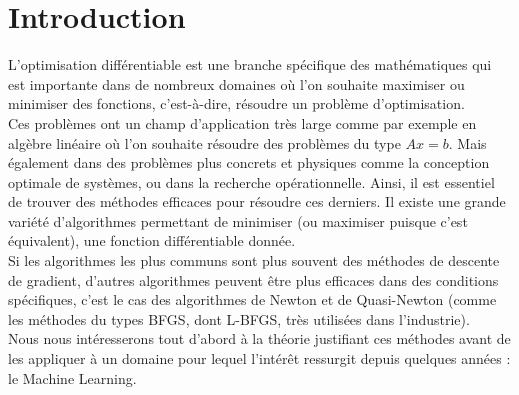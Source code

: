 \chapter{Introduction}
L'optimisation différentiable est une branche spécifique des mathématiques qui est importante dans de nombreux domaines où l'on souhaite maximiser ou minimiser des fonctions, c'est-à-dire, résoudre un problème d'optimisation.\\

 Ces problèmes ont un champ d'application très large comme par exemple en algèbre linéaire où l'on souhaite résoudre des problèmes du type $Ax=b$. Mais également dans des problèmes plus concrets et physiques comme la conception optimale de systèmes, ou dans la recherche opérationnelle. Ainsi, il est essentiel de trouver des méthodes efficaces pour résoudre ces derniers. Il existe une grande variété d'algorithmes permettant de minimiser (ou maximiser puisque c'est équivalent), une fonction différentiable donnée.\\

 Si les algorithmes les plus communs sont plus souvent des méthodes de descente de gradient, d'autres algorithmes peuvent être plus efficaces dans des conditions spécifiques, c'est le cas des algorithmes de Newton et de Quasi-Newton (comme les méthodes du types BFGS, dont L-BFGS, très utilisées dans l'industrie).\\


Nous nous intéresserons tout d'abord à la théorie justifiant ces méthodes avant de les appliquer à un domaine pour lequel l'intérêt ressurgit depuis quelques années : le Machine Learning.
